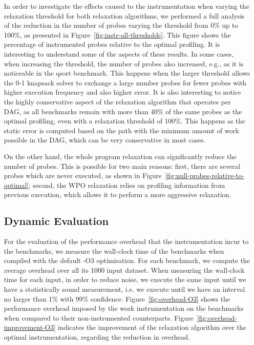 In order to investigate the effects caused to the instrumentation when varying the relaxation threshold for both relaxation algorithms, we performed a full analysis of the reduction in the number of probes varying the threshold from 0\% up to 100\%, as presented in Figure~\ref{fig:instr-all-thresholds}.
This figure shows the percentage of instrumented probes relative to the optimal profiling.
It is interesting to understand some of the aspects of these results.
In some cases, when increasing the threshold, the number of probes also increased, e.g., as it is noticeable in the {\flagstype qsort} benchmark.
This happens when the larger threshold allows the 0-1 knapsack solver to exchange a large number probes for fewer probes with higher execution frequency and also higher error.
It is also interesting to notice the highly conservative aspect of the relaxation algorithm that operates per DAG, as all benchmarks remain with more than 40\% of the same probes as the optimal profiling, even with a relaxation threshold of 100\%.
This happens as the static error is computed based on the path with the minimum amount of work possible in the DAG, which can be very conservative in most cases.

On the other hand, the whole program relaxation can significantly reduce the number of probes.
This is possible for two main reasons: first, there are several probes which are never executed, as shown in Figure~\ref{fig:null-probes-relative-to-optimal};
second, the WPO relaxation relies on profiling information from previous execution, which allows it to perform a more aggressive relaxation.

\subsection{Dynamic Evaluation}

For the evaluation of the performance overhead that the instrumentation incur to the benchmarks, we measure the wall-clock time of the benchmarks when compiled with the default {\flagstype -O3} optimisation.
For each benchmark, we compute the average overhead over all its 1000 input dataset.
When measuring the wall-clock time for each input, in order to reduce noise, we execute the same input until we have a statistically sound measurement, i.e. we execute until we have an interval no larger than 1\% with 99\% confidence.
Figure~\ref{fig:overhead-O3} shows the performance overhead imposed by the work instrumentation on the benchmarks when compared to their non-instrumented counterparts.
Figure~\ref{fig:overhead-improvement-O3} indicates the improvement of the relaxation algorithm over the optimal instrumentation, regarding the reduction in overhead.

